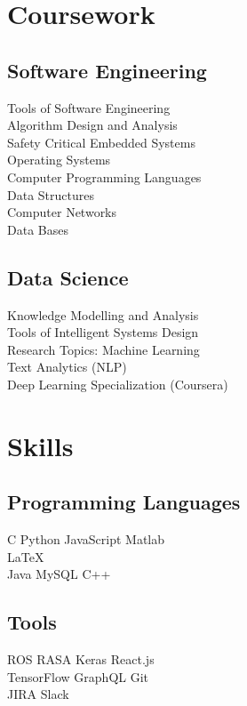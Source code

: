 \documentclass[]{deedy-resume-openfont}
\begin{document}
\begin{minipage}[t]{0.33\textwidth}

\section{Coursework}
\subsection{Software Engineering}
Tools of Software Engineering \\
Algorithm Design and Analysis\\
Safety Critical Embedded Systems \\
Operating Systems \\
Computer Programming Languages \\
Data Structures \\
Computer Networks \\
Data Bases \\
\sectionsep

\subsection{Data Science}
Knowledge Modelling and Analysis \\
Tools of Intelligent Systems Design \\
Research Topics: Machine Learning \\
Text Analytics (NLP) \\
Deep Learning Specialization (Coursera)
\sectionsep


\section{Skills}
\subsection{Programming Languages}
\textbullet{} C \textbullet{} Python \textbullet{} JavaScript \textbullet{} Matlab \\
\textbullet{} \LaTeX\ \\ 
\textbullet{} Java \textbullet{} MySQL \textbullet{} C++
\sectionsep
\subsection{Tools}
\textbullet{} ROS \textbullet{} RASA \textbullet{}  Keras \textbullet{} React.js \\ \textbullet{} TensorFlow 
\textbullet{} GraphQL \textbullet{} Git \\ 
\textbullet{} JIRA \textbullet{} Slack\\

\sectionsep

%
%

\end{minipage} 
\end{document}
